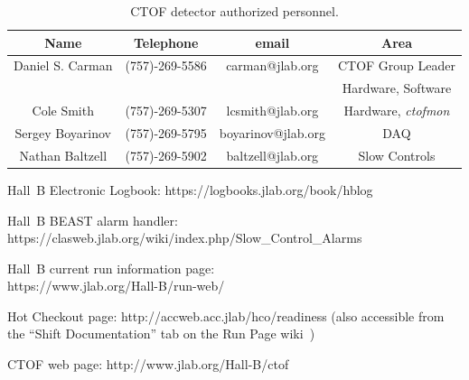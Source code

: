 \documentclass[12pt]{article}
\begin{document}
\begin{table}[htbp]
\begin{center}
\begin{tabular} {|c|c|c|c|} \hline
Name             & Telephone      & email              & Area             \\ \hline \hline
Daniel S. Carman & (757)-269-5586 & carman@jlab.org    & CTOF Group Leader\\
                 &                &                    & Hardware, Software \\ \hline
Cole Smith       & (757)-269-5307 & lcsmith@jlab.org   & Hardware, {\it ctofmon} \\ \hline
Sergey Boyarinov & (757)-269-5795 & boyarinov@jlab.org & DAQ              \\ \hline
Nathan Baltzell  & (757)-269-5902 & baltzell@jlab.org  & Slow Controls    \\ \hline
\end{tabular}
\caption{CTOF detector authorized personnel.}
\label{expert-list}
\end{center}
\end{table}

\clearpage

\vfil
\eject

\begin{thebibliography}{99}

Hall~B Electronic Logbook: https://logbooks.jlab.org/book/hblog

Hall~B BEAST alarm handler: \\
https://clasweb.jlab.org/wiki/index.php/Slow\_Control\_Alarms

Hall~B current run information page:\\
https://www.jlab.org/Hall-B/run-web/

Hot Checkout page: http://accweb.acc.jlab/hco/readiness (also accessible from the
``Shift Documentation'' tab on the Run Page wiki~\cite{run-page})

CTOF web page: http://www.jlab.org/Hall-B/ctof

\end{thebibliography}
\end{document}
